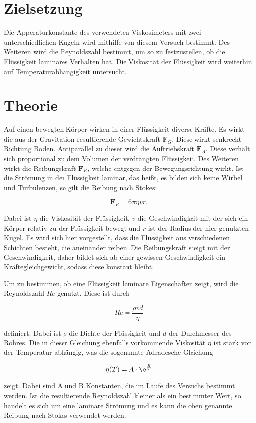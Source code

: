 \section{Zielsetzung}

Die Apperaturkonstante des verwendeten Viskosimeters mit zwei unterschiedlichen Kugeln wird mithilfe von diesem Versuch bestimmt.
Des Weiteren wird die Reynoldszahl bestimmt, um so zu festzustellen, ob die Flüssigkeit laminares Verhalten hat. 
Die Viskosität der Flüssigkeit wird weiterhin auf Temperaturabhängigkeit untersucht.

\section{Theorie}
\label{sec:Theorie}

Auf einen bewegten Körper wirken in einer Flüssigkeit diverse Kräfte. Es wirkt die aus der Gravitation resultierende Gewichtskraft $\symbf{F}_G$. Diese wirkt senkrecht Richtung Boden.
Antiparallel zu dieser wird die Auftriebskraft $\symbf{F}_A$. Diese verhält sich proportional zu dem Volumen der verdrängten Flüssigkeit.
Des Weiteren wirkt die Reibungskraft $\symbf{F}_R$, welche entgegen der Bewegungsrichtung wirkt.
Ist die Strömung in der Flüssigkeit laminar, das heißt, es bilden sich keine Wirbel und Turbulenzen, so gilt die Reibung nach Stokes:

\begin{equation}
\label{eqn:stokes}
    \symbf{F}_R = 6 \pi \eta v r .
\end{equation}

Dabei ist $\eta$ die Viskosität der Flüssigkeit, $v$ die Geschwindigkeit mit der sich ein Körper relativ zu der Flüssigkeit bewegt und $r$ ist der Radius der hier genutzten Kugel.
Es wird sich hier vorgestellt, dass die Flüssigkeit aus verschiedenen Schichten besteht, die aneinander reiben.
Die Reibungskraft steigt mit der Geschwindigkeit, daher bildet sich ab einer gewissen Geschwindigkeit ein Kräftegleichgewicht, sodass diese konstant bleibt.

Um zu bestimmen, ob eine Flüssigkeit laminare Eigenschaften zeigt, wird die Reynoldszahl $Re$ genutzt. Diese ist durch

\begin{equation}
\label{eqn:reynold}
    Re = \frac{\rho v d}{\eta}
\end{equation}

definiert. Dabei ist $\rho$ die Dichte der Flüssigkeit und $d$ der Durchmesser des Rohres. 
Die in dieser Gleichung ebenfalls vorkommende Viskosität $\eta$ ist stark von der Temperatur abhängig, was die sogenannte Adradesche Gleichung

\begin{equation}
\label{eqn:tempabhaengig}
    \eta(T) = A \cdot \e^\frac{B}{T}
\end{equation}

zeigt. Dabei sind A und B Konstanten, die im Laufe des Versuchs bestimmt werden. 
Ist die resultierende Reynoldszahl kleiner als ein bestimmter Wert, so handelt es sich um eine laminare Strömung und es kann die oben genannte Reibung nach Stokes verwendet werden.
